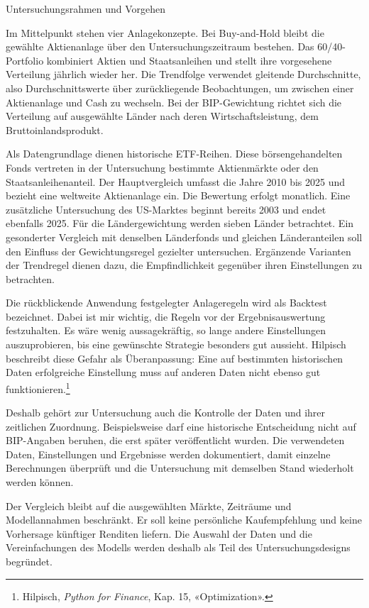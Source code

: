 \documentclass[
  ngerman,
  a4paper,
  DIV=11,
  oneside]{scrreprt}
\begin{document}
Untersuchungsrahmen und Vorgehen

Im Mittelpunkt stehen vier Anlagekonzepte. Bei Buy-and-Hold bleibt die
gewählte Aktienanlage über den Untersuchungszeitraum bestehen. Das
60/40-Portfolio kombiniert Aktien und Staatsanleihen und stellt ihre
vorgesehene Verteilung jährlich wieder her. Die Trendfolge verwendet
gleitende Durchschnitte, also Durchschnittswerte über zurückliegende
Beobachtungen, um zwischen einer Aktienanlage und Cash zu wechseln. Bei
der BIP-Gewichtung richtet sich die Verteilung auf ausgewählte Länder
nach deren Wirtschaftsleistung, dem Bruttoinlandsprodukt.

Als Datengrundlage dienen historische ETF-Reihen. Diese
börsengehandelten Fonds vertreten in der Untersuchung bestimmte
Aktienmärkte oder den Staatsanleihenanteil. Der Hauptvergleich umfasst
die Jahre 2010 bis 2025 und bezieht eine weltweite Aktienanlage ein. Die
Bewertung erfolgt monatlich. Eine zusätzliche Untersuchung des
US-Marktes beginnt bereits 2003 und endet ebenfalls 2025. Für die
Ländergewichtung werden sieben Länder betrachtet. Ein gesonderter
Vergleich mit denselben Länderfonds und gleichen Länderanteilen soll den
Einfluss der Gewichtungsregel gezielter untersuchen. Ergänzende
Varianten der Trendregel dienen dazu, die Empfindlichkeit gegenüber
ihren Einstellungen zu betrachten.

Die rückblickende Anwendung festgelegter Anlageregeln wird als Backtest
bezeichnet. Dabei ist mir wichtig, die Regeln vor der Ergebnisauswertung
festzuhalten. Es wäre wenig aussagekräftig, so lange andere
Einstellungen auszuprobieren, bis eine gewünschte Strategie besonders
gut aussieht. Hilpisch beschreibt diese Gefahr als Überanpassung: Eine
auf bestimmten historischen Daten erfolgreiche Einstellung muss auf
anderen Daten nicht ebenso gut funktionieren.\footnote{Hilpisch,
  \emph{Python for Finance}, Kap. 15, «Optimization».}

Deshalb gehört zur Untersuchung auch die Kontrolle der Daten und ihrer
zeitlichen Zuordnung. Beispielsweise darf eine historische Entscheidung
nicht auf BIP-Angaben beruhen, die erst später veröffentlicht wurden.
Die verwendeten Daten, Einstellungen und Ergebnisse werden dokumentiert,
damit einzelne Berechnungen überprüft und die Untersuchung mit demselben
Stand wiederholt werden können.

Der Vergleich bleibt auf die ausgewählten Märkte, Zeiträume und
Modellannahmen beschränkt. Er soll keine persönliche Kaufempfehlung und
keine Vorhersage künftiger Renditen liefern. Die Auswahl der Daten und
die Vereinfachungen des Modells werden deshalb als Teil des
Untersuchungsdesigns begründet.
\end{document}

